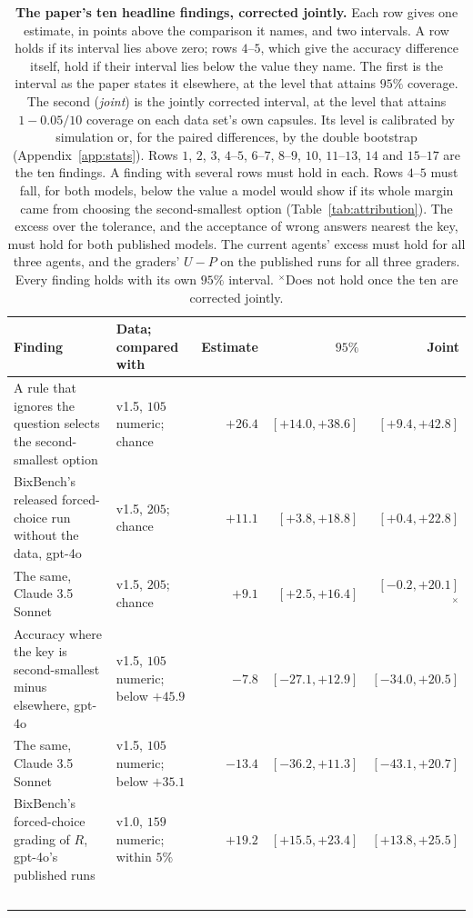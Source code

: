 \documentclass{article}
\begin{document}
\begin{table}[htbp]
\centering\footnotesize\setlength{\tabcolsep}{4pt}
\caption{\textbf{The paper's ten headline findings, corrected jointly.} Each row gives one estimate, in points above
the comparison it names, and two intervals. A row holds if its interval lies above zero; rows $4$--$5$, which give
the accuracy difference itself, hold if their interval lies below the value they name. The first is the interval as the paper states it elsewhere, at the level
that attains $95\%$ coverage. The second (\emph{joint}) is the jointly corrected interval, at the level that attains
$1-0.05/10$ coverage on each data set's own capsules. Its level is calibrated by simulation or, for the paired
differences, by the double bootstrap (Appendix~\ref{app:stats}). Rows $1$, $2$, $3$, $4$--$5$, $6$--$7$, $8$--$9$,
$10$, $11$--$13$, $14$ and $15$--$17$ are the ten findings. A finding with several rows must hold in each. Rows
$4$--$5$ must fall, for both models, below the value a model would show if its whole margin came from choosing the
second-smallest option (Table~\ref{tab:attribution}). The excess over the tolerance, and the acceptance of wrong
answers nearest the key, must hold for both published models. The current agents' excess must hold for all three
agents, and the graders' $U-P$ on the published runs for all three graders. Every finding holds with its own $95\%$
interval. $^{\times}$Does not hold once the ten are corrected jointly.}
\label{tab:claims}
\begin{tabularx}{\linewidth}{@{}>{\raggedright\arraybackslash}Xlrrr@{}}
\toprule
Finding & Data; compared with & Estimate & $95\%$ & Joint\\
\midrule
A rule that ignores the question selects the second-smallest option & v1.5, $105$ numeric; chance & $+26.4$ & $[+14.0,+38.6]$ & $[+9.4,+42.8]$\\
BixBench's released forced-choice run without the data, gpt-4o & v1.5, $205$; chance & $+11.1$ & $[+3.8,+18.8]$ & $[+0.4,+22.8]$\\
The same, Claude 3.5 Sonnet & v1.5, $205$; chance & $+9.1$ & $[+2.5,+16.4]$ & $[-0.2,+20.1]$$^{\times}$\\
Accuracy where the key is second-smallest minus elsewhere, gpt-4o & v1.5, $105$ numeric; below $+45.9$ & $-7.8$ & $[-27.1,+12.9]$ & $[-34.0,+20.5]$\\
The same, Claude 3.5 Sonnet & v1.5, $105$ numeric; below $+35.1$ & $-13.4$ & $[-36.2,+11.3]$ & $[-43.1,+20.7]$\\
BixBench's forced-choice grading of $R$, gpt-4o's published runs & v1.0, $159$ numeric; within $5\%$ & $+19.2$ & $[+15.5,+23.4]$ & $[+13.8,+25.5]$\\
$$
\end{tabularx}
\end{table}
\end{document}
